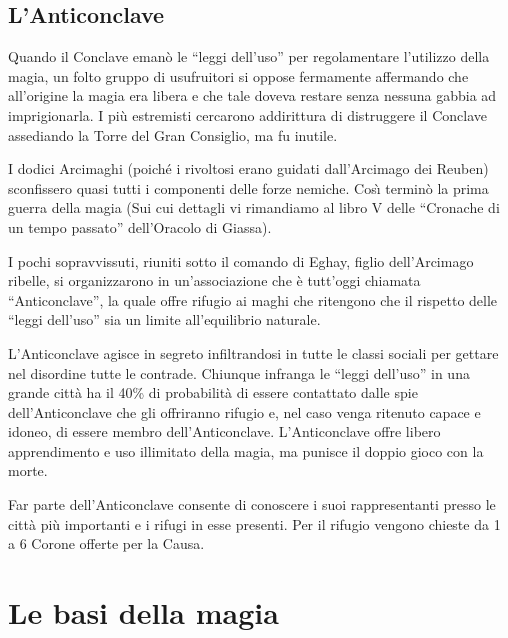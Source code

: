 \subsection{L'Anticonclave}

\iffullversion
Quando il Conclave eman\`o le ``leggi dell'uso'' per regolamentare
l'utilizzo della magia, un folto gruppo di usufruitori si oppose
fermamente affermando che all'origine la magia era libera e che tale
doveva restare senza nessuna gabbia ad imprigionarla. I pi\`u
estremisti cercarono addirittura di distruggere il Conclave assediando
la Torre del Gran Consiglio, ma fu inutile.

I dodici Arcimaghi (poich\'e i rivoltosi erano guidati dall'Arcimago
dei Reuben) sconfissero quasi tutti i componenti delle forze nemiche.
Cos\`{\i} termin\`o la prima guerra della magia (Sui cui dettagli vi
rimandiamo al libro V delle ``Cronache di un tempo passato''
dell'Oracolo di Giassa).

I pochi sopravvissuti, riuniti sotto il comando di Eghay, figlio
dell'Arcimago ribelle, si organizzarono in un'associazione che \`e
tutt'oggi chiamata ``Anticonclave'', la quale offre rifugio ai maghi
che ritengono che il rispetto delle ``leggi dell'uso'' sia un limite
all'equilibrio naturale.
\fi

L'Anticonclave agisce in segreto infiltrandosi in tutte le classi
sociali per gettare nel disordine tutte le contrade. Chiunque infranga
le ``leggi dell'uso'' in una grande citt\`a ha il 40\% di probabilit\`a
di essere contattato dalle spie dell'Anticonclave che gli offriranno rifugio
e, nel caso venga ritenuto capace e idoneo, di essere membro dell'Anticonclave.
L'Anticonclave offre libero apprendimento e uso illimitato della magia, ma
punisce il doppio gioco con la morte.

Far parte dell'Anticonclave consente di conoscere i suoi rappresentanti
presso le citt\`a pi\`u importanti e i rifugi in esse presenti. Per il
rifugio vengono chieste da 1 a 6 Corone offerte per la Causa.

\clearpage    
\section{Le basi della magia} 
\label{basimagia}

